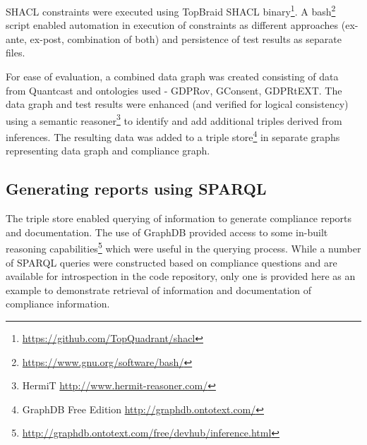 SHACL constraints were executed using TopBraid SHACL binary\footnote{\url{https://github.com/TopQuadrant/shacl}}.
A bash\footnote{\url{https://www.gnu.org/software/bash/}} script enabled automation in execution of constraints as different approaches (ex-ante, ex-post, combination of both) and persistence of test results as separate files.

For ease of evaluation, a combined data graph was created consisting of data from Quantcast and ontologies used - GDPRov, GConsent, GDPRtEXT. 
The data graph and test results were enhanced (and verified for logical consistency) using a semantic reasoner\footnote{HermiT \url{http://www.hermit-reasoner.com/}} to identify and add additional triples derived from inferences.
The resulting data was added to a triple store\footnote{GraphDB Free Edition \url{http://graphdb.ontotext.com/}} in separate graphs representing data graph and compliance graph.

\subsection{Generating reports using SPARQL}\label{sec:testing:shacl:reports}
The triple store enabled querying of information to generate compliance reports and documentation.
The use of GraphDB provided access to some in-built reasoning capabilities\footnote{\url{http://graphdb.ontotext.com/free/devhub/inference.html}} which were useful in the querying process.
While a number of SPARQL queries were constructed based on compliance questions and are available for introspection in the code repository, only one is provided here as an example to demonstrate retrieval of information and documentation of compliance information.

